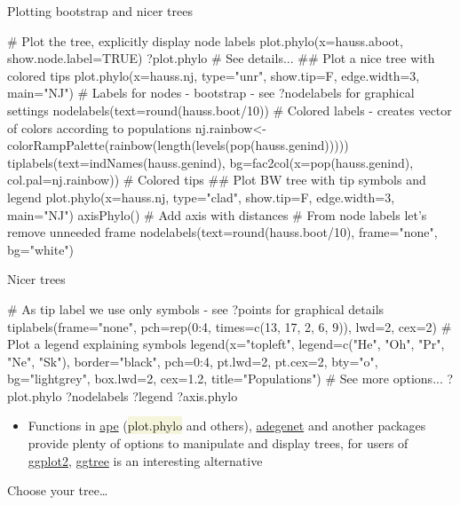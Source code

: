 \documentclass[compress, ucs, xelatex, 11pt, xcolor=svgnames, aspectratio=169,
	hyperref={
		bookmarks=true,
		unicode=true,
		colorlinks=true,
		pdftitle={Molecular data in R},
		plainpages=false,
		pdfauthor={Vojtech Zeisek},
		pdfsubject={Course about phylogeny and evolution in R},
		pdfcreator={XeLaTeX},
		pdfkeywords={R, evolution, phylogeny, molecular data},
		linkcolor=Crimson, %
		anchorcolor=Magenta, %
		citecolor=Magenta, %
		filecolor=Magenta, %
		menucolor=Magenta, %
		urlcolor=DodgerBlue, %
		pdftex},
	url={hyphens, lowtilde} %
	]{beamer}
\renewcommand{\texttt}[1]{\colorbox{Beige}{{\ttfamily #1}}}
\begin{document}
\begin{frame}[fragile]{Plotting bootstrap and nicer trees}
	\begin{spluscode}
    # Plot the tree, explicitly display node labels
    plot.phylo(x=hauss.aboot, show.node.label=TRUE)
    ?plot.phylo # See details...
    ## Plot a nice tree with colored tips
    plot.phylo(x=hauss.nj, type="unr", show.tip=F, edge.width=3, main="NJ")
    # Labels for nodes - bootstrap - see ?nodelabels for graphical settings
    nodelabels(text=round(hauss.boot/10))
    # Colored labels - creates vector of colors according to populations
    nj.rainbow<-colorRampPalette(rainbow(length(levels(pop(hauss.genind)))))
    tiplabels(text=indNames(hauss.genind), bg=fac2col(x=pop(hauss.genind),
      col.pal=nj.rainbow)) # Colored tips
    ## Plot BW tree with tip symbols and legend
    plot.phylo(x=hauss.nj, type="clad", show.tip=F, edge.width=3, main="NJ")
    axisPhylo() # Add axis with distances
    # From node labels let's remove unneeded frame
    nodelabels(text=round(hauss.boot/10), frame="none", bg="white")
	\end{spluscode}
\end{frame}

\begin{frame}[fragile]{Nicer trees}
	\begin{spluscode}
    # As tip label we use only symbols - see ?points for graphical details
    tiplabels(frame="none", pch=rep(0:4, times=c(13, 17, 2, 6, 9)), lwd=2,
      cex=2)
    # Plot a legend explaining symbols
    legend(x="topleft", legend=c("He", "Oh", "Pr", "Ne", "Sk"),
      border="black", pch=0:4, pt.lwd=2, pt.cex=2, bty="o", bg="lightgrey",
      box.lwd=2, cex=1.2, title="Populations")
    # See more options...
    ?plot.phylo
    ?nodelabels
    ?legend
    ?axis.phylo
	\end{spluscode}
	\begin{itemize}
		\item Functions in \href{https://CRAN.R-project.org/package=ape}{ape} (\texttt{plot.phylo} and others), \href{https://CRAN.R-project.org/package=adegenet}{adegenet} and another packages provide plenty of options to manipulate and display trees, for users of \href{https://CRAN.R-project.org/package=ggplot2}{ggplot2}, \href{https://bioconductor.org/packages/release/bioc/html/ggtree.html}{ggtree} is an interesting alternative
	\end{itemize}
\end{frame}

\begin{frame}{Choose your tree\ldots}
	\begin{center}
		\texttt{[image: nj2.png]}
	\end{center}
\end{frame}
\end{document}
